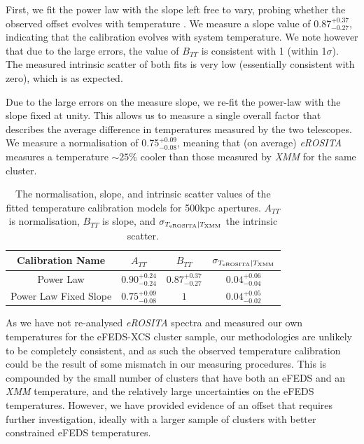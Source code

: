 \documentclass[fleqn,usenatbib]{mnras}
\begin{document}
First, we fit the power law with the slope left free to vary, probing whether the observed offset evolves with temperature \citep[as found in][comparing between {\em Chandra} and {\em XMM}]{xmmchandracal}. We measure a slope value of 0.87$^{+0.37}_{-0.27}$, indicating that the calibration evolves with system temperature.  We note however that due to the large errors, the value of $B_{TT}$ is consistent with 1 (within 1$\sigma$).  The measured intrinsic scatter of both fits is very low (essentially consistent with zero), which is as expected.
 
Due to the large errors on the measure slope, we re-fit the power-law with the slope fixed at unity.  This allows us to measure a single overall factor that describes the average difference in temperatures measured by the two telescopes.  We measure a normalisation of 0.75$^{+0.09}_{-0.08}$, meaning that (on average) {\em eROSITA} measures a temperature ${\sim}25\%$ cooler than those measured by {\em XMM} for the same cluster.

\begin{table}
\begin{center}
\caption[]{{\small The normalisation, slope, and intrinsic scatter values of the fitted temperature calibration models for 500kpc apertures. $A_{TT}$ is normalisation, $B_{TT}$ is slope, and $\sigma_{T_{\rm{eROSITA}}|T_{\rm{XMM}}}$ the intrinsic scatter.}\label{tab:tempcal}}
\vspace{1mm}
\begin{tabular}{cccc}
\hline
\hline
Calibration Name & $A_{TT}$ & $B_{TT}$ & $\sigma_{T_{\rm{eROSITA}}|T_{\rm{XMM}}}$\\
\hline
\hline
Power Law & $0.90^{+0.24}_{-0.24}$ & $0.87^{+0.37}_{-0.27}$ & $0.04^{+0.06}_{-0.04}$ \\
\hline
Power Law Fixed Slope & $0.75^{+0.09}_{-0.08}$ & $1$ & $0.04^{+0.05}_{-0.02}$ \\
\hline
\end{tabular}
\end{center}
\end{table}

As we have not re-analysed {\em eROSITA} spectra and measured our own temperatures for the eFEDS-XCS cluster sample, our methodologies are unlikely to be completely consistent, and as such the observed temperature calibration could be the result of some mismatch in our measuring procedures. This is compounded by the small number of clusters that have both an eFEDS and an {\em XMM} temperature, and the relatively large uncertainties on the eFEDS temperatures. However, we have provided evidence of an offset that requires further investigation, ideally with a larger sample of clusters with better constrained eFEDS temperatures.
\end{document}
